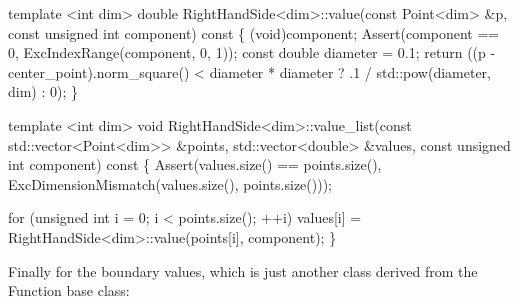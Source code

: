 \begin{DoxyCode}
\textcolor{keyword}{template} <\textcolor{keywordtype}{int} dim>
\textcolor{keywordtype}{double} RightHandSide<dim>::value(\textcolor{keyword}{const} Point<dim> &p,
                                 \textcolor{keyword}{const} \textcolor{keywordtype}{unsigned} \textcolor{keywordtype}{int} component)\textcolor{keyword}{ const}
\textcolor{keyword}{}\{
    (void)component;
    Assert(component == 0, ExcIndexRange(component, 0, 1));
    \textcolor{keyword}{const} \textcolor{keywordtype}{double} diameter = 0.1;
    \textcolor{keywordflow}{return} ((p - center\_point).norm\_square() < diameter * diameter
                ? .1 / std::pow(diameter, dim)
                : 0);
\}


\textcolor{keyword}{template} <\textcolor{keywordtype}{int} dim>
\textcolor{keywordtype}{void} RightHandSide<dim>::value\_list(\textcolor{keyword}{const} std::vector<Point<dim>> &points,
                                    std::vector<double> &values,
                                    \textcolor{keyword}{const} \textcolor{keywordtype}{unsigned} \textcolor{keywordtype}{int} component)\textcolor{keyword}{ const}
\textcolor{keyword}{}\{
    Assert(values.size() == points.size(),
           ExcDimensionMismatch(values.size(), points.size()));

    \textcolor{keywordflow}{for} (\textcolor{keywordtype}{unsigned} \textcolor{keywordtype}{int} i = 0; i < points.size(); ++i)
        values[i] = RightHandSide<dim>::value(points[i], component);
\}
\end{DoxyCode}


Finally for the boundary values, which is just another class derived from the {\ttfamily Function} base class\+:


